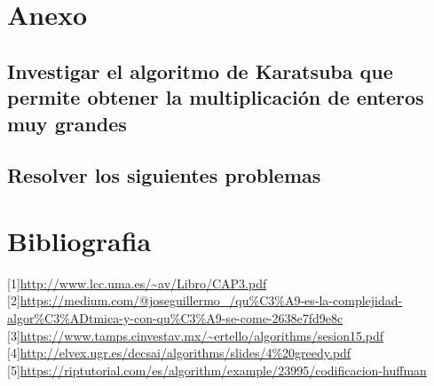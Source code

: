 \documentclass[spanish]{article}
\begin{document}
	\section{Anexo}			
	\subsection{Investigar el algoritmo de Karatsuba que permite obtener la multiplicación de enteros muy grandes}
	\subsection{Resolver los siguientes problemas}
	\section{Bibliografia}
		{[}1{]}\url{http://www.lcc.uma.es/~av/Libro/CAP3.pdf}\\
		{[}2{]}\url{https://medium.com/@joseguillermo_/qu\%C3\%A9-es-la-complejidad-algor\%C3\%ADtmica-y-con-qu\%C3\%A9-se-come-2638e7fd9e8c}\\
		{[}3{]}\url{https://www.tamps.cinvestav.mx/~ertello/algorithms/sesion15.pdf	}\\		
		{[}4{]}\url{http://elvex.ugr.es/decsai/algorithms/slides/4\%20greedy.pdf}\\		
		{[}5{]}\url{https://riptutorial.com/es/algorithm/example/23995/codificacion-huffman}\\		
	
\end{document}
